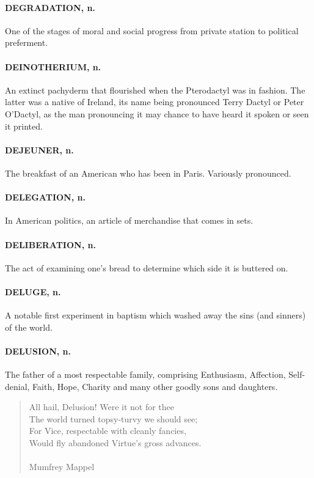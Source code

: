 \documentclass[11pt]{article}
\begin{document}
\paragraph{DEGRADATION, n.}  One of the stages of moral and social progress from
private station to political preferment.

\paragraph{DEINOTHERIUM, n.}  An extinct pachyderm that flourished when the
Pterodactyl was in fashion.  The latter was a native of Ireland, its
name being pronounced Terry Dactyl or Peter O'Dactyl, as the man
pronouncing it may chance to have heard it spoken or seen it printed.

\paragraph{DEJEUNER, n.}  The breakfast of an American who has been in Paris.
Variously pronounced.

\paragraph{DELEGATION, n.}  In American politics, an article of merchandise that
comes in sets.

\paragraph{DELIBERATION, n.}  The act of examining one's bread to determine which
side it is buttered on.

\paragraph{DELUGE, n.}  A notable first experiment in baptism which washed away
the sins (and sinners) of the world.

\paragraph{DELUSION, n.}  The father of a most respectable family, comprising
Enthusiasm, Affection, Self-denial, Faith, Hope, Charity and many
other goodly sons and daughters.

\begin{quote}   All hail, Delusion!  Were it not for thee \\
  The world turned topsy-turvy we should see; \\
  For Vice, respectable with cleanly fancies, \\
  Would fly abandoned Virtue's gross advances. \\
 \\
Mumfrey Mappel \end{quote}
\end{document}
